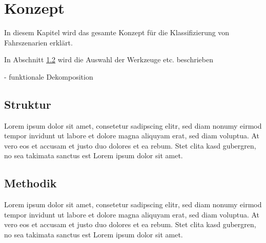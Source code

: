 
\chapter{Konzept}
\label{konzept}

In diesem Kapitel wird das gesamte Konzept für die Klassifizierung von Fahrszenarien erklärt.

In Abschnitt \ref{konzept_methodik} wird die Auswahl der Werkzeuge etc. beschrieben

- funktionale Dekomposition

\section{Struktur}
\label{konzept_struktur}

Lorem ipsum dolor sit amet, consetetur sadipscing elitr, sed diam nonumy eirmod tempor invidunt ut labore et dolore magna aliquyam erat, sed diam voluptua. At vero eos et accusam et justo duo dolores et ea rebum. Stet clita kasd gubergren, no sea takimata sanctus est Lorem ipsum dolor sit amet.  


\section{Methodik}
\label{konzept_methodik}

Lorem ipsum dolor sit amet, consetetur sadipscing elitr, sed diam nonumy eirmod tempor invidunt ut labore et dolore magna aliquyam erat, sed diam voluptua. At vero eos et accusam et justo duo dolores et ea rebum. Stet clita kasd gubergren, no sea takimata sanctus est Lorem ipsum dolor sit amet.  